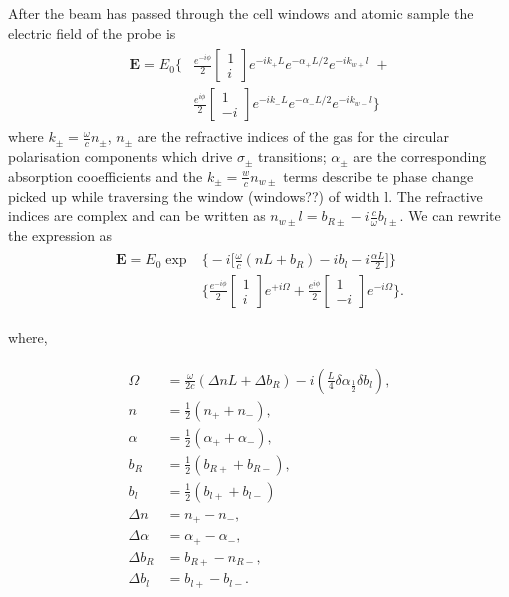 \documentclass{article}
\begin{document}
\begin{multicols}{2}
After the beam has passed through the cell windows and atomic sample the electric field of the probe is
\begin{align}
\begin{split}
\bm{E} = E_0 \Biggl\{ &\frac{e^{-i\phi}}{2}\begin{bmatrix} 1 \\ i \end{bmatrix}e^{-ik_+L} e^{-\alpha_+L/2} e^{-ik_{w+}l} \;+ \\
&\frac{e^{i\phi}}{2}\begin{bmatrix} 1 \\ -i \end{bmatrix}e^{-ik_-L} e^{-\alpha_-L/2} e^{-ik_{w-}l} \Biggr\}
\end{split}
\end{align}
where $k_\pm = \frac{\omega}{c}n_\pm$, $n_\pm$ are the refractive indices of the gas for the circular polarisation components which drive $\sigma_\pm$ transitions; $\alpha_\pm$ are the corresponding absorption cooefficients and the $k_\pm = \frac{w}{c}n_{w\pm}$ terms describe te phase change picked up while traversing the window (windows??) of width l. The refractive indices are complex and can be written as $n_{w\pm}l=b_{R\pm} - i\frac{c}{\omega}b_{l\pm}$. We can rewrite the expression as
\begin{align}\begin{split}
\bm{E} = E_0 \exp&\Biggl\{-i\Biggl[\frac{\omega}{c}(nL+b_R)-ib_l-i\frac{\alpha L}{2}\Biggr]\Biggr\} \\
&\Biggl\{\frac{e^{-i\phi}}{2}\begin{bmatrix} 1 \\ i\end{bmatrix} e^{+i\Omega} + \frac{e^{i\phi}}{2} \begin{bmatrix} 1 \\ -i \end{bmatrix} e^{-i\Omega} \Biggr\}.
\end{split}\end{align}

where,

\begin{align}\begin{split}
\Omega &= \frac{\omega}{2c}(\Delta n L + \Delta b_R) - i\left(\frac{L}{4}\delta\alpha _ \frac{1}{2}\delta b_l \right), \\
n &= \frac{1}{2}(n_+ + n_-),\\
\alpha &= \frac{1}{2}(\alpha_+ + \alpha_-), \\
b_R &= \frac{1}{2}(b_{R+} + b_{R-}),\\
b_l &= \frac{1}{2}(b_{l+} + b_{l-}) \\
\Delta n &= n_+ - n_-,\\
\Delta \alpha &= \alpha_+ - \alpha_-,\\
\Delta b_R &= b_{R+} - n_{R-},\\
\Delta b_l &= b_{l+} - b_{l-}.
\end{split}\end{align}


\end{multicols}
\end{document}
